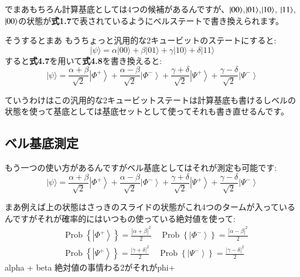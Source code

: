 でまあもちろん計算基底としては4つの候補があるんですが、$\ket{00}$,$\ket{01}$,$\ket{10}$, $\ket{11}$,$\ket{00}$の状態が\textbf{式1.7}で表されているようにベルステートで書き換えられます。

そうするとまあ
もうちょっと汎用的な2キュービットのステートにすると:
\begin{equation}
|\psi\rangle=\alpha|00\rangle+\beta|01\rangle+\gamma|10\rangle+\delta|11\rangle
\end{equation}
すると\textbf{式4.7}を用いて\textbf{式4.8}を書き換えると:
\begin{equation}
|\psi\rangle=\frac{\alpha+\beta}{\sqrt{2}}\left|\Phi^{+}\right\rangle+\frac{\alpha-\beta}{\sqrt{2}}\left|\Phi^{-}\right\rangle+\frac{\gamma+\delta}{\sqrt{2}}\left|\Psi^{+}\right\rangle+\frac{\gamma-\delta}{\sqrt{2}}\left|\Psi^{-}\right\rangle
\end{equation}

ていうわけはこの汎用的な2キュービットステートは計算基底も書けるしベルの状態を使って基底としては基底セットとして使ってそれも書き直せるんです。
\subsection{ベル基底測定}
もう一つの使い方があるんですがベル基底としてはそれが測定も可能です:
\begin{equation}
|\psi\rangle=\frac{\alpha+\beta}{\sqrt{2}}\left|\Phi^{+}\right\rangle+\frac{\alpha-\beta}{\sqrt{2}}\left|\Phi^{-}\right\rangle+\frac{\gamma+\delta}{\sqrt{2}}\left|\Psi^{+}\right\rangle+\frac{\gamma-\delta}{\sqrt{2}}\left|\Psi^{-}\right\rangle
\end{equation}

まあ例えば上の状態はさっきのスライドの状態がこれ4つのタームが入っているんですがそれが確率的にはいつもの使っている絶対値を使って:
\begin{equation}
\begin{aligned}
&\operatorname{Prob}\left\{\left|\Phi^{+}\right\rangle\right\}=\frac{|\alpha+\beta|^{2}}{2} \quad \operatorname{Prob}\left\{\left|\Phi^{-}\right\rangle\right\}=\frac{|\alpha-\beta|^{2}}{2} \\
&\operatorname{Prob}\left\{\left|\Psi^{+}\right\rangle\right\}=\frac{|\gamma+\delta|^{2}}{2} \quad \operatorname{Prob}\left\{\left|\Psi^{-}\right\rangle\right\}=\frac{|\gamma-\delta|^{2}}{2}
\end{aligned}
\end{equation}
\iffalse
alpha + beta
絶対値の事情わる2がそれがphi+

